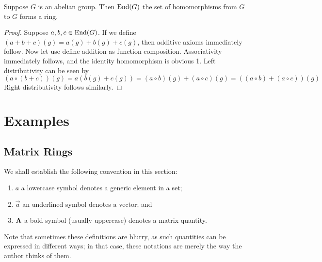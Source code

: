 \begin{proposition}
    Suppose \(G\) is an abelian group.
    Then \(\operatorname{End}(G)\) the set of homomorphisms from \(G\) to \(G\)
    forms a ring.
\end{proposition}
\begin{proof}
    Suppose \(a,b,c \in \operatorname{End}(G)\).
    If we define \((a+b+c)(g) = a(g)+b(g)+c(g)\),
    then additive axioms immediately follow.
    Now let use define addition as function composition.
    Associativity immediately follows,
    and the identity homomorphism is obvious 1.
    Left distributivity can be seen by
    \begin{equation*}
        (a\circ(b+c))(g) = a(b(g)+c(g))
        = (a \circ b)(g) + (a \circ c)(g)
        = ((a \circ b) + (a \circ c))(g)
    \end{equation*}
    Right distributivity follows similarly.
\end{proof}


\section{Examples}\label{sec:matrix-rings}

\subsection*{Matrix Rings}

\begin{remark}
    We shall establish the following convention in this section:
    \begin{enumerate}[label={(\roman*)}, itemsep=0mm]
        \item \(a\) a lowercase symbol denotes a generic element in a set;
        \item \(\vec{a}\) an underlined symbol denotes a vector; and
        \item \(\vb{A}\) a bold symbol (usually uppercase)
            denotes a matrix quantity.
    \end{enumerate}
    Note that sometimes these definitions are blurry,
    as such quantities can be expressed in different ways;
    in that case, these notations are merely the way the author thinks of them.
\end{remark}


